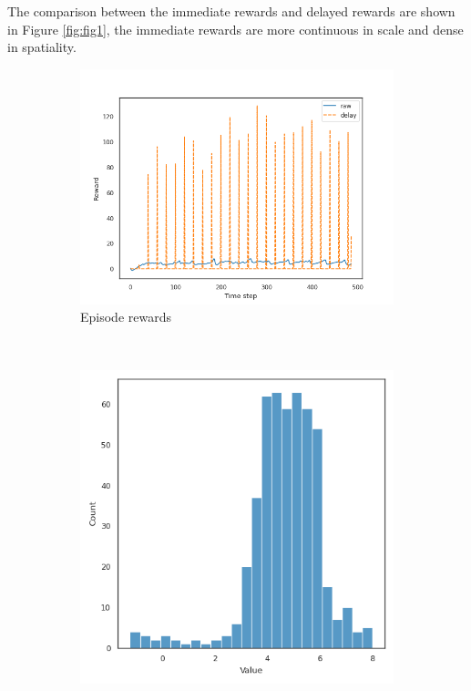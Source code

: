 The comparison between the immediate rewards and delayed rewards are shown in Figure \ref{fig:fig1}, the immediate rewards are more continuous in scale and dense in spatiality.
\begin{figure}[H]
    \centering
    \begin{subfigure}{0.33\textwidth}
    \includegraphics[width=\textwidth]{assets/delay_mode-constant-delay-20_0_delayed.png}
    \caption{Episode rewards}
    \end{subfigure}
    ~
    \begin{subfigure}{0.31\textwidth}
    \includegraphics[width=\textwidth]{assets/delay_mode-constant-delay-20_distribution_raw_0_delayed.png}

\end{subfigure}
\end{figure}
